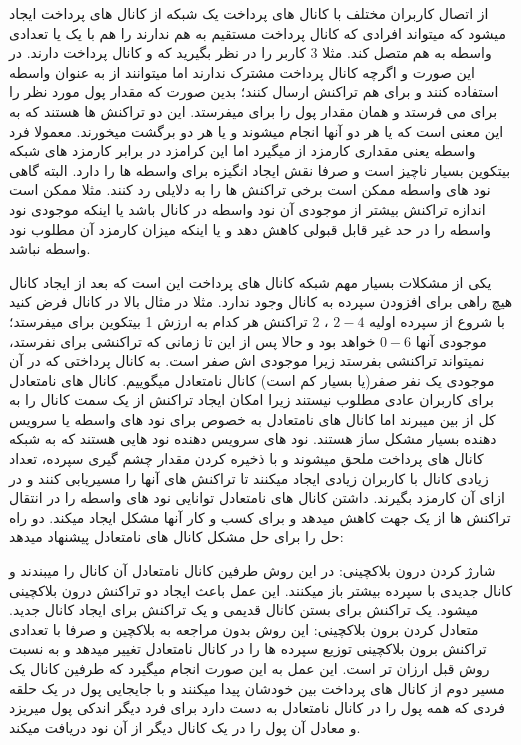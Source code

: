 از اتصال کاربران مختلف با کانال های پرداخت یک شبکه از کانال های پرداخت ایجاد میشود که میتواند افرادی که کانال پرداخت مستقیم به هم ندارند را هم با یک یا تعدادی واسطه به هم متصل کند. مثلا 3 کاربر  را در نظر بگیرید که  و  کانال پرداخت دارند. در این صورت  و  اگرچه کانال پرداخت مشترک ندارند اما میتوانند از  به عنوان واسطه استفاده کنند و برای هم تراکنش ارسال کنند؛ بدین صورت که  مقدار پول مورد نظر را برای  می فرستد و  همان مقدار پول را برای  میفرستد. این دو تراکنش ها  هستند که به این معنی است که یا هر دو آنها انجام میشوند و یا هر دو برگشت میخورند. معمولا فرد واسطه یعنی  مقداری کارمزد از   میگیرد اما این کرامزد در برابر کارمزد های شبکه بیتکوین بسیار ناچیز است و صرفا نقش ایجاد انگیزه برای واسطه ها را دارد. البته گاهی نود های واسطه ممکن است برخی تراکنش ها را به دلایلی رد کنند. مثلا ممکن است اندازه تراکنش بیشتر از موجودی  آن نود واسطه در کانال باشد یا اینکه موجودی نود واسطه را در حد غیر قابل قبولی کاهش دهد و یا اینکه میزان کارمزد آن مطلوب نود واسطه نباشد. 

یکی از مشکلات بسیار مهم شبکه کانال های پرداخت این است که بعد از ایجاد کانال هیچ راهی برای افزودن سپرده به کانال وجود ندارد. مثلا در مثال بالا در کانال  فرض کنید با شروع از سپرده اولیه
 $2-4$
 ، 2 تراکنش هر کدام به ارزش 1 بیتکوین برای  میفرستد؛ موجودی آنها
$0-6$   
خواهد بود و حالا پس از این تا زمانی که   تراکنشی برای  نفرستد،  نمیتواند تراکنشی بفرستد زیرا موجودی اش صفر است. به کانال پرداختی که در آن موجودی یک نفر صفر(یا بسیار کم است) کانال نامتعادل  میگوییم. کانال های نامتعادل برای کاربران عادی مطلوب نیستند زیرا امکان ایجاد تراکنش از یک سمت کانال را به کل از بین میبرند اما کانال های نامتعادل به خصوص برای نود های واسطه یا سرویس دهنده  بسیار مشکل ساز هستند. نود های سرویس دهنده نود هایی هستند که به شبکه کانال های پرداخت ملحق میشوند و با ذخیره کردن مقدار چشم گیری سپرده، تعداد زیادی کانال با کاربران زیادی ایجاد میکنند تا تراکنش های آنها را مسیریابی کنند و در ازای آن کارمزد بگیرند. داشتن کانال های نامتعادل توانایی نود های واسطه را در انتقال تراکنش ها از یک جهت کاهش میدهد و برای کسب و کار آنها مشکل ایجاد میکند.  دو راه حل را برای حل مشکل کانال های نامتعادل پیشنهاد میدهد:



 شارژ کردن درون بلاکچینی: در این روش طرفین کانال نامتعادل آن کانال را میبندند و کانال جدیدی با سپرده بیشتر باز میکنند. این عمل باعث ایجاد دو تراکنش درون بلاکچینی میشود. یک تراکنش برای بستن کانال قدیمی و یک تراکنش برای ایجاد کانال جدید.
متعادل کردن برون بلاکچینی: این روش بدون مراجعه به بلاکچین و صرفا با تعدادی تراکنش برون بلاکچینی توزیع سپرده ها را در کانال نامتعادل تغییر میدهد و به نسبت روش قبل ارزان تر است. این عمل به این صورت انجام میگیرد که طرفین کانال یک مسیر دوم از کانال های پرداخت بین خودشان پیدا میکنند و با جایجایی پول در یک حلقه فردی که همه پول را در کانال نامتعادل به دست دارد برای فرد دیگر اندکی پول میریزد و معادل آن پول را در یک کانال دیگر از آن نود دریافت میکند.

